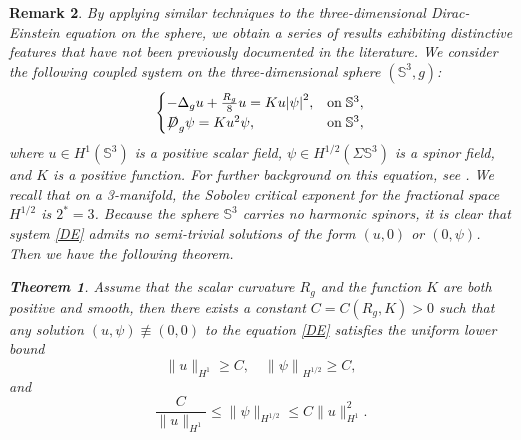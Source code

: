 \documentclass[a4paper, 12pt]{article}
\newtheorem{theorem}{Theorem}[section]
\newtheorem{remark}[theorem]{Remark}
\def\slashiii#1{\setbox0=\hbox{$#1$}#1\hskip-\wd0\hbox to\wd0{\hss\sl/\/\hss}}
\begin{document}
\begin{remark}
	By applying similar techniques to the three-dimensional Dirac-Einstein equation on the sphere, we obtain a series of results exhibiting distinctive features that have not been previously documented in the literature. We consider the following coupled system on the three-dimensional sphere $(\mathbb{S}^3, g)$:
	\begin{equation}\label{DE}
		\begin{cases}
			{ - {\Delta _g}u + \frac{{{R_g}}}{8}u = Ku{{\left| \psi  \right|}^2},}&{{\text{on}}\;{\mathbb{S}^3},} \\
			{{\slashiii{D}_g}\psi  = K{u^2}\psi ,}&{{\text{on}}\;{\mathbb{S}^3},}
		\end{cases}
	\end{equation}
	where $u \in H^1(\mathbb{S}^3)$ is a positive scalar field, $\psi \in H^{1/2}(\Sigma\mathbb{S}^3)$ is a spinor field, and $K$ is a positive function. For further background on this equation, see \cite{MR4234090}. We recall that on a 3-manifold, the Sobolev critical exponent for the fractional space $H^{1/2}$ is $2^* = 3$.  Because the sphere $\mathbb{S}^3$ carries no harmonic spinors, it is clear that system \eqref{DE} admits no semi-trivial solutions of the form $(u, 0)$ or $(0, \psi)$. Then we have the following theorem.
	\begin{theorem}\label{DE-th}
		Assume that the scalar curvature \(R_g\) and the function \(K\) are both positive and smooth, then there exists a constant $C=C\left(R_g,K \right)>0 $ such that any solution $\left( u, \psi\right) \not \equiv\left(0,0 \right) $ to the equation \eqref{DE} satisfies the uniform lower bound
		$$
		\|u\|_{H^1} \geq C,\quad {\left\| \psi  \right\|_{{H^{1/2}}}} \geq C,
		$$
		and
		$$\frac{C}{\|u\|_{H^1}} \leq \|\psi\|_{{H^{1/2}}} \leq C \|u\|_{H^1}^2.$$
	\end{theorem}
\end{remark}
\end{document}
